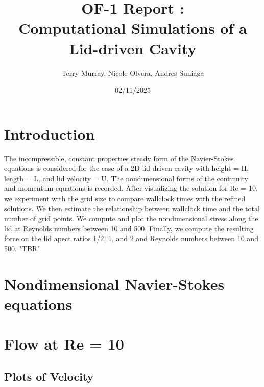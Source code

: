 \documentclass[11pt]{article}
\title{\bf OF-1 Report : \\[2mm] Computational Simulations of a Lid-driven Cavity}
\author{Terry Murray, Nicole Olvera, Andres Suniaga}
\date{02/11/2025}
\begin{document}
\maketitle

\noindent\makebox[\textwidth]{\rule{\textwidth}{0.2pt}}
\tableofcontents
\noindent\makebox[\textwidth]{\rule{\textwidth}{0.2pt}}
\pagebreak

\section{Introduction}
The incompressible, constant properties steady form of the Navier-Stokes equations is considered for the case of a 2D lid driven cavity with height = H, length = L, and lid velocity = U. 
The nondimensional forms of the continuity and momentum equations is recorded. After visualizing the solution for Re = 10, we experiment with the grid size to compare wallclock times with the refined solutions. 
We then estimate the relationship between wallclock time and the total number of grid points. We compute and plot the nondimensional stress along the lid at Reynolds numbers between 10 and 500. 
Finally, we compute the resulting force on the lid apect ratios 1/2, 1, and 2 and Reynolds numbers between 10 and 500. "TBR"
\section{Nondimensional Navier-Stokes equations}

\pagebreak

\section{Flow at Re = 10}

\subsection{Plots of Velocity}
\end{document}
